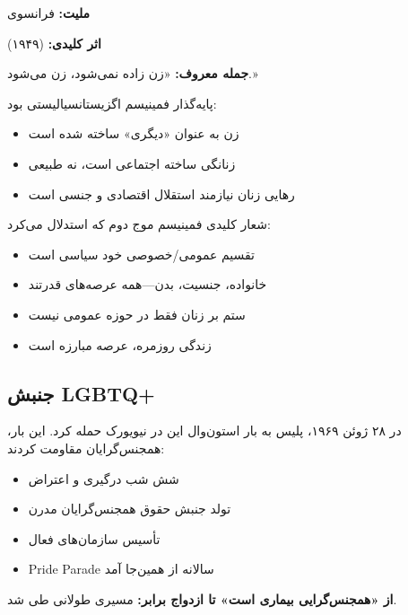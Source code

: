 \begin{personbox}

\textbf{ملیت:} فرانسوی

\textbf{اثر کلیدی:}  (۱۹۴۹)

\textbf{جمله معروف:} «زن زاده نمی‌شود، زن می‌شود.»

\mediumspace

 پایه‌گذار فمینیسم اگزیستانسیالیستی بود:
\begin{itemize}[nosep]
    \item زن به عنوان «دیگری» ساخته شده است
    \item زنانگی ساخته اجتماعی است، نه طبیعی
    \item رهایی زنان نیازمند استقلال اقتصادی و جنسی است
\end{itemize}
\end{personbox}

\begin{defbox}
شعار کلیدی فمینیسم موج دوم که استدلال می‌کرد:
\begin{itemize}[nosep]
    \item تقسیم عمومی/خصوصی خود سیاسی است
    \item خانواده، جنسیت، بدن—همه عرصه‌های قدرتند
    \item ستم بر زنان فقط در حوزه عمومی نیست
    \item زندگی روزمره، عرصه مبارزه است
\end{itemize}
\end{defbox}

\subsection{جنبش LGBTQ+}

\begin{historybox}
در ۲۸ ژوئن ۱۹۶۹، پلیس به بار استون‌وال این در نیویورک حمله کرد. این بار، همجنس‌گرایان مقاومت کردند:
\begin{itemize}[nosep]
    \item شش شب درگیری و اعتراض
    \item تولد جنبش حقوق همجنس‌گرایان مدرن
    \item تأسیس سازمان‌های فعال
    \item Pride Parade سالانه از همین‌جا آمد
\end{itemize}

\textbf{از «همجنس‌گرایی بیماری است» تا ازدواج برابر:} مسیری طولانی طی شد.
\end{historybox}


